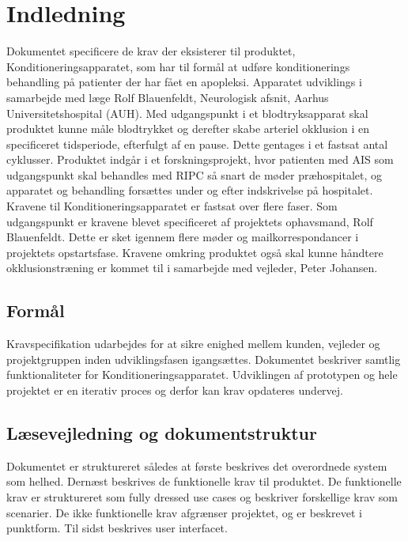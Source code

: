 	\chapter{Indledning}
	Dokumentet specificere de krav der eksisterer til produktet, Konditioneringsapparatet, som har til formål at udføre konditionerings behandling på patienter der har fået en apopleksi. Apparatet udviklings i samarbejde med læge Rolf Blauenfeldt, Neurologisk afsnit, Aarhus Universitetshospital (AUH). Med udgangspunkt i et blodtryksapparat skal produktet kunne måle blodtrykket og derefter skabe arteriel okklusion i en specificeret tidsperiode, efterfulgt af en pause. Dette gentages i et fastsat antal cyklusser. Produktet indgår i et forskningsprojekt, hvor patienten med AIS som udgangspunkt skal behandles med RIPC så snart de møder præhospitalet, og apparatet og behandling forsættes under og efter indskrivelse på hospitalet. 
	Kravene til Konditioneringsapparatet er fastsat over flere faser. Som udgangspunkt er kravene blevet specificeret af projektets ophavsmand, Rolf Blauenfeldt. Dette er sket igennem flere møder og mailkorrespondancer i projektets opstartsfase. Kravene omkring produktet også skal kunne håndtere okklusionstræning er kommet til i samarbejde med vejleder, Peter Johansen. 
	
	\section{Formål}
	Kravspecifikation udarbejdes for at sikre enighed mellem kunden, vejleder og projektgruppen inden udviklingsfasen igangsættes. Dokumentet beskriver samtlig funktionaliteter for Konditioneringsapparatet. Udviklingen af prototypen og hele projektet er en iterativ proces og derfor kan krav opdateres undervej. 
	
	\section{Læsevejledning og dokumentstruktur}
	Dokumentet er struktureret således at første beskrives det overordnede system som helhed. Dernæst beskrives de funktionelle krav til produktet. De funktionelle krav er struktureret som fully dressed use cases og beskriver forskellige krav som scenarier. De ikke funktionelle krav afgrænser projektet, og er beskrevet i punktform. Til sidst beskrives user interfacet. 
	
	\pagebreak
